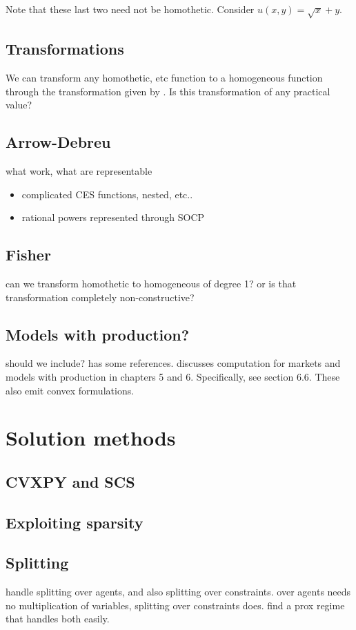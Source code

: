 \documentclass{article}
\begin{document}
Note that these last two need not be homothetic. Consider $u(x,y) = \sqrt{x} + y$.

\subsection{Transformations}
We can transform any homothetic, etc function to a homogeneous function
through the transformation given by \cite{jain2005market}.
Is this transformation of any practical value?


\subsection{Arrow-Debreu}
what work, what are representable
\begin{itemize}
\item complicated CES functions, nested, etc..
\item rational powers represented through SOCP
\end{itemize}
\subsection{Fisher}
can we transform homothetic to homogeneous of degree 1? or is that transformation completely non-constructive?

\subsection{Models with production?}
should we include? \cite{jain2005market} has some references.
\cite{nisan2007algorithmic} discusses computation for markets and models with production in chapters 5 and 6. Specifically, see section 6.6. These also emit convex formulations.

\section{Solution methods}

\subsection{CVXPY and SCS}
\subsection{Exploiting sparsity}
\subsection{Splitting}
handle splitting over agents, and also splitting over constraints. over agents needs no multiplication of variables, splitting over constraints does. find a prox regime that handles both easily.
\end{document}
